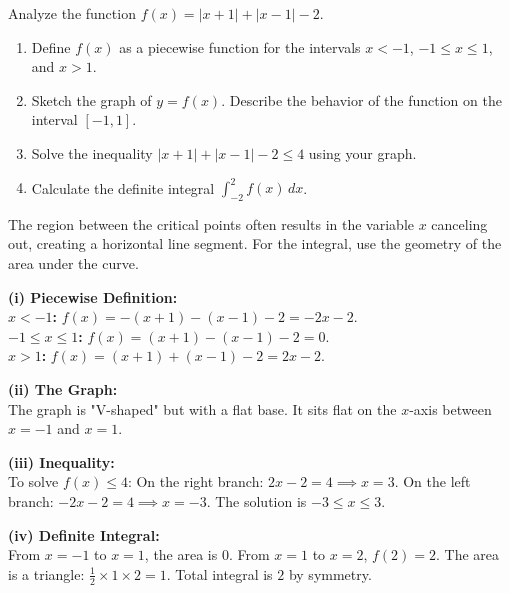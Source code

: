 \begin{problem}
Analyze the function $f(x) = |x + 1| + |x - 1| - 2$.
\begin{enumerate}[label=(\roman*)]
\item Define $f(x)$ as a piecewise function for the intervals $x < -1$, $-1 \le x \le 1$, and $x > 1$.
\item Sketch the graph of $y = f(x)$. Describe the behavior of the function on the interval $[-1, 1]$.
\item Solve the inequality $|x + 1| + |x - 1| - 2 \le 4$ using your graph.
\item Calculate the definite integral $\int_{-2}^{2} f(x) \, dx$.
\end{enumerate}

\begin{center}
\end{center}
\end{problem}

\begin{hint}
The region between the critical points often results in the variable $x$ canceling out, creating a horizontal line segment. For the integral, use the geometry of the area under the curve.
\end{hint}

\begin{solution}
\textbf{(i) Piecewise Definition:}\\
\textbf{$x < -1$:} $f(x) = -(x+1) - (x-1) - 2 = -2x - 2$.\\
\textbf{$-1 \le x \le 1$:} $f(x) = (x+1) - (x-1) - 2 = 0$.\\
\textbf{$x > 1$:} $f(x) = (x+1) + (x-1) - 2 = 2x - 2$.

\textbf{(ii) The Graph:}\\
The graph is "V-shaped" but with a flat base. It sits flat on the $x$-axis between $x=-1$ and $x=1$.

\textbf{(iii) Inequality:}\\
To solve $f(x) \le 4$: On the right branch: $2x - 2 = 4 \implies x = 3$. On the left branch: $-2x - 2 = 4 \implies x = -3$. The solution is $-3 \le x \le 3$.

\textbf{(iv) Definite Integral:}\\
From $x=-1$ to $x=1$, the area is $0$. From $x=1$ to $x=2$, $f(2) = 2$. The area is a triangle: $\frac{1}{2} \times 1 \times 2 = 1$. Total integral is $2$ by symmetry.
\end{solution}

